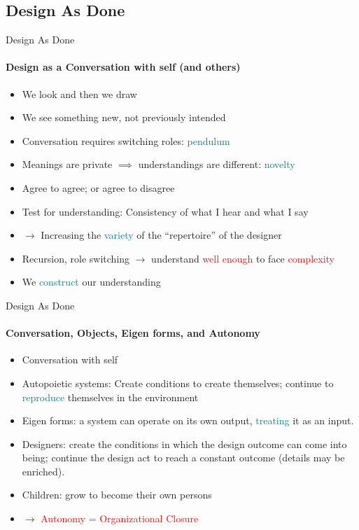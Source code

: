 \documentclass[
	11pt,
	aspectratio=169,
]{beamer}
\begin{document}
        \subsection{Design As Done}
            \begin{frame}{Design As Done}
            \framesubtitle{Design as a Conversation with self (and others)}
    		    \begin{itemize}
    		        \item<1-> We look and then we draw
    		        \item<1-> We see something new, not previously intended
    		        \item<2-> Conversation requires switching roles: \textcolor{teal}{pendulum}
    		        \item<3-> Meanings are private $\implies$ understandings are different: \textcolor{teal}{novelty}
    		        \item<4-> Agree to agree; or agree to disagree
    		        \item<4-> Test for understanding: Consistency of what I hear and what I say
    		        \item<5-> $\longrightarrow$ Increasing the \textcolor{teal}{variety} of the ``repertoire'' of the designer
    		        \item<6-> Recursion, role switching $\longrightarrow$ understand \textcolor{red}{well enough} to face \textcolor{red}{complexity}
		            \item<7-> We \textcolor{teal}{construct} our understanding
    		    \end{itemize}
            \end{frame}
            \begin{frame}{Design As Done}
            \framesubtitle{Conversation, Objects, Eigen forms, and Autonomy}
    		    \begin{itemize}
    		        \item<1-> Conversation with self
    		        \item<2-> Autopoietic systems: Create conditions to create themselves; continue to \textcolor{teal}{reproduce} themselves in the environment
    		        \item<3-> Eigen forms: a system can operate on its own output, \textcolor{teal}{treating} it as an input.
    		        \item<4-> Designers: create the conditions in which the design outcome can come into being; continue the design act to reach a constant outcome (details  may be enriched).
    		        \item<5-> Children: grow to become their own persons
    		        \item<6-> $\longrightarrow$ \textcolor{red}{Autonomy = Organizational Closure}
    		    \end{itemize}
            \end{frame}
\end{document}
